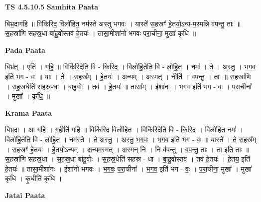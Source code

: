 \documentclass[17pt]{extarticle}
\begin{document}
\textbf{TS 4.5.10.5 } \newline
\textbf{Samhita Paata} \newline

बिभ्र॒दाग॑हि ॥ विकि॑रिद॒ विलो॑हित॒ नम॑स्ते अस्तु भगवः । यास्ते॑ स॒हस्रꣳ॑ हे॒तयो॒ऽन्य-म॒स्मन्नि व॑पन्तु॒ ताः ॥                            स॒हस्रा॑णि सहस्र॒धा बा॑हु॒वोस्तव॑ हे॒तयः॑ । तासा॒मीशा॑नो भगवः परा॒चीना॒ मुखा॑ कृधि ॥ \newline

\textbf{Pada Paata} \newline

बिभ्र॑त् । एति॑ । ग॒हि॒ ॥ विकि॑रि॒देति॒ वि - कि॒रि॒द॒ । विलो॑हि॒तेति॒ वि - लो॒हि॒त॒ । नमः॑ । ते॒ । अ॒स्तु॒ । भ॒ग॒व॒ इति॑ भग - वः॒ ॥ याः । ते॒ । स॒हस्र᳚म् । हे॒तयः॑ । अ॒न्यम् । अ॒स्मत् । नीति॑ । व॒प॒न्तु॒ । ताः ॥ स॒हस्रा॑णि । स॒ह॒स्र॒धेति॑ सहस्र-धा । बा॒हु॒वोः । तव॑ । हे॒तयः॑ ॥ तासा᳚म् । ईशा॑नः । भ॒ग॒व॒ इति॑ भग - वः॒ । प॒रा॒चीना᳚ । मुखा᳚ । कृ॒धि॒ ॥  \newline


\textbf{Krama Paata} \newline

बिभ्र॒दा । आ ग॑हि । ग॒हीति॑ गहि ॥ विकि॑रिद॒ विलो॑हित । विकि॑रि॒देति॒ वि - कि॒रि॒द॒ । विलो॑हित॒ नमः॑ । विलो॑हि॒तेति॒ वि - लो॒हि॒त॒ । नम॑स्ते । ते॒ अ॒स्तु॒ । अ॒स्तु॒ भ॒ग॒वः॒ । भ॒ग॒व॒ इति॑ भग - वः॒ ॥ यास्ते᳚ । ते॒ स॒हस्र᳚म् । स॒हस्रꣳ॑ हे॒तयः॑ । हे॒तयो॒ऽन्यम् । अ॒न्यम॒स्मत् । अ॒स्मन् नि । नि व॑पन्तु । व॒प॒न्तु॒ ताः । ता इति॒ ताः ॥ स॒हस्रा॑णि सहस्र॒धा । स॒ह॒स्र॒धा बा॑हु॒वोः । स॒ह॒स्र॒धेति॑ सहस्र - धा । बा॒हु॒वोस्तव॑ । तव॑ हे॒तयः॑ । हे॒तय॒ इति॑ हे॒तयः॑ ॥ तासा॒मीशा॑नः । ईशा॑नो भगवः । भ॒ग॒वः॒ प॒रा॒चीना᳚ । भ॒ग॒व॒ इति॑ भग - वः॒ । प॒रा॒चीना॒ मुखा᳚ । मुखा॑ कृधि । कृ॒धीति॑ कृधि । \newline

\textbf{Jatai Paata} \newline
\end{document}
